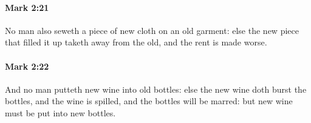 		\paragraph{Mark 2:21} %
			\label{MARK-2-21}

			No man also seweth a piece of new cloth on an old garment: else the new piece that filled it up taketh away from the old, and the rent is made worse.

			\begin{framed}
			\scriptsize
				\begin{compactdesc}
					\item[SBLG] 
				\end{compactdesc}
			\end{framed}

		\paragraph{Mark 2:22} %
			\label{MARK-2-22}

			And no man putteth new wine into old bottles: else the new wine doth burst the bottles, and the wine is spilled, and the bottles will be marred: but new wine must be put into new bottles.

